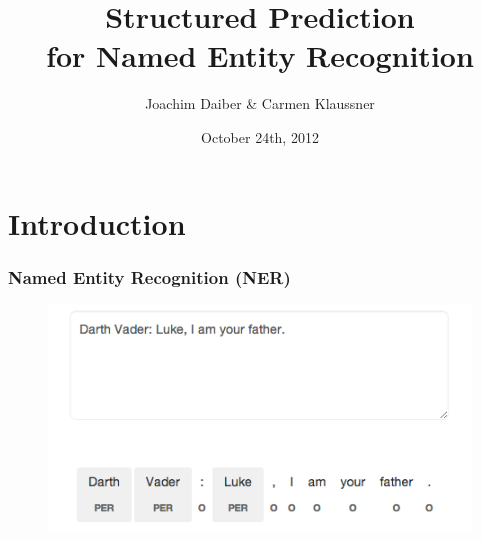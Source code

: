 \documentclass[10pt]{beamer}
\title[Machine Learning] %
{
Structured Prediction\\ for Named Entity Recognition}
\author %
{Joachim Daiber \& Carmen Klaussner}
\institute[University of Groningen] %
 {
  Information Science\\
  University of Groningen
  }
\date[Short Occasion] %
{October 24th, 2012}
\begin{document}
\begin{frame}
  \titlepage
\end{frame}



%
%












\section{Introduction}


\begin{frame}
\frametitle{Named Entity Recognition (NER)}

\begin{figure}[htbp]
        \centering
                \includegraphics[scale=0.5]{figures/bsp1.png}
        \label{fig:figures_bsp1}
\end{figure}



\end{frame}
\end{document}
